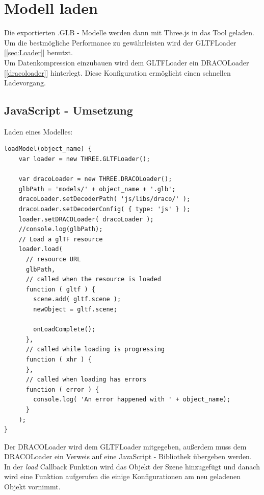 \section{Modell laden}
Die exportierten .GLB - Modelle werden dann mit Three.js in das Tool geladen. \\
Um die bestmögliche Performance zu gewährleisten wird der GLTFLoader [\ref{sec:Loader}] benutzt. \\ Um Datenkompression einzubauen wird dem GLTFLoader ein DRACOLoader [\ref{dracoloader}] hinterlegt. Diese Konfiguration ermöglicht einen schnellen Ladevorgang.
\newpage
\subsection{JavaScript - Umsetzung}
Laden eines Modelles: 
\begin{lstlisting}
loadModel(object_name) {
    var loader = new THREE.GLTFLoader();
    
    var dracoLoader = new THREE.DRACOLoader();
    glbPath = 'models/' + object_name + '.glb';
    dracoLoader.setDecoderPath( 'js/libs/draco/' );
    dracoLoader.setDecoderConfig( { type: 'js' } );
    loader.setDRACOLoader( dracoLoader );
    //console.log(glbPath);
    // Load a glTF resource
    loader.load(
      // resource URL
      glbPath,
      // called when the resource is loaded
      function ( gltf ) {
        scene.add( gltf.scene );
        newObject = gltf.scene;
    
        onLoadComplete();
      },
      // called while loading is progressing
      function ( xhr ) {
      },
      // called when loading has errors
      function ( error ) {
        console.log( 'An error happened with ' + object_name);
      }
    );
}
\end{lstlisting}
Der DRACOLoader wird dem GLTFLoader mitgegeben, außerdem muss dem DRACOLoader ein Verweis auf eine JavaScript - Bibliothek übergeben werden. \\
In der \textit{load} Callback Funktion wird das Objekt der Szene hinzugefügt und danach wird eine Funktion aufgerufen die einige Konfigurationen am neu geladenen Objekt vornimmt. 
\newpage
